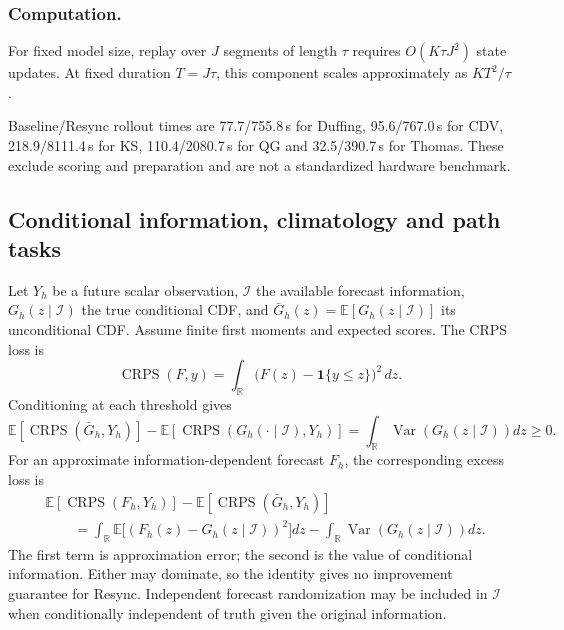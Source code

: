 \documentclass[gmd,manuscript]{copernicus}
\begin{document}
\subsubsection{Computation.}
For fixed model size, replay over $J$ segments of length $\tau$ requires $O(K\tau J^2)$ state updates. At fixed duration $T=J\tau$, this component scales approximately as $KT^2/\tau$.

Baseline/Resync rollout times are 77.7/755.8\,s for Duffing, 95.6/767.0\,s for CDV, 218.9/8111.4\,s for KS, 110.4/2080.7\,s for QG and 32.5/390.7\,s for Thomas. These exclude scoring and preparation and are not a standardized hardware benchmark.

\subsection{Conditional information, climatology and path tasks}\label{app:note11}
Let $Y_h$ be a future scalar observation, $\mathcal I$ the available forecast information, $G_h(z\mid\mathcal I)$ the true conditional CDF, and $\bar G_h(z)=\mathbb E[G_h(z\mid\mathcal I)]$ its unconditional CDF. Assume finite first moments and expected scores. The CRPS loss is \citep{gneiting2007proper}
\begin{equation}
\operatorname{CRPS}(F,y)=\int_{\mathbb R}\big(F(z)-\mathbf1\{y\le z\}\big)^2\,dz.
\end{equation}
Conditioning at each threshold gives
\begin{equation}
\mathbb E\!\left[\operatorname{CRPS}(\bar G_h,Y_h)\right]
-\mathbb E\!\left[\operatorname{CRPS}(G_h(\cdot\mid\mathcal I),Y_h)\right]
=\int_{\mathbb R}\operatorname{Var}\!\left(G_h(z\mid\mathcal I)\right)dz\ge0.
\end{equation}
For an approximate information-dependent forecast $F_h$, the corresponding excess loss is
\begin{align}
&\mathbb E\!\left[\operatorname{CRPS}(F_h,Y_h)\right]
-\mathbb E\!\left[\operatorname{CRPS}(\bar G_h,Y_h)\right] \nonumber\\
&\qquad=\int_{\mathbb R}\mathbb E\big[(F_h(z)-G_h(z\mid\mathcal I))^2\big]dz
-\int_{\mathbb R}\operatorname{Var}\!\left(G_h(z\mid\mathcal I)\right)dz.
\end{align}
The first term is approximation error; the second is the value of conditional information. Either may dominate, so the identity gives no improvement guarantee for Resync. Independent forecast randomization may be included in $\mathcal I$ when conditionally independent of truth given the original information.
\end{document}

